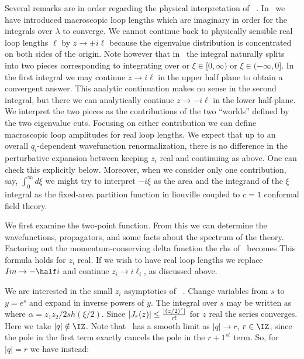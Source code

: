 Several remarks are in order regarding the physical interpretation
of \macptii\ . In \macropt\ we have introduced macroscopic 
loop lengths which are imaginary in order for the integrals 
over $\lambda$ to converge. We cannot continue back to 
physically sensible real loop lengths $\ell$ by $z\to \pm i \ell$ 
because the eigenvalue distribution is concentrated on both 
sides of the origin. Note however that in \macptii\ the integral 
naturally splits into two pieces corresponding to integrating over
or $\xi\in [0,\infty)$ or $\xi\in (-\infty,0]$.  In the first 
integral we may continue $z\to i \ell$ in the upper half plane
to obtain a convergent 
answer. This analytic continuation makes no sense in the second 
integral, but there we can analytically continue
$z\to -i\ell$ in the lower half-plane.
We interpret the two pieces as the 
contributions of the two ``worlds'' defined by the two 
eigenvalue cuts. Focusing on either contribution we 
can define macroscopic loop amplitudes for real loop lengths.
We expect that up to an
overall $q_i$-dependent wavefunction renormalization, there
is no difference in the perturbative expansion
between keeping $z_i$ real and continuing 
as above. One can check this explicitly below.
Moreover, when we consider only one contribution, say, 
$\int_0^\infty d \xi$ we might 
try to interpret
$-i\xi$ as the area and the integrand of the 
$\xi$ integral as the fixed-area partition function in liouville
coupled to $c=1$ conformal field theory. 


We first examine the two-point function. 
From this we can determine the wavefunctions, propagators, and 
some facts about the spectrum of the theory. Factoring out
the momentum-conserving delta function the rhs of \macptii\ becomes
\eqn{}
This formula holds for $z_i$ real. If we wish to have 
real loop lengths we replace $Im\to -\half i$ and continue 
$z_i\to i \ell_i$, as discussed above.

We are interested in the small $z_i$ asymptotics of \twpti\ .
Change variables 
from $s$ to $y=e^s$ and expand in inverse powers of $y$. 
The integral over $s$ may be written as
\eqn{}
where $\alpha=z_1z_2/2 sh(\xi/2)$. Since $|J_r(z)|\leq {|(z/2)^r|
\over r!}$ for $z$ real the series converges.
Here we take $|q|\notin\IZ$.  Note that \expbessl\ has a 
smooth limit as $|q|\to r$, $r\in \IZ$, since the pole in the
first term exactly cancels the pole in the $r+1^{st}$ term.
So, for $|q|=r$ we have instead:
\eqn{}

